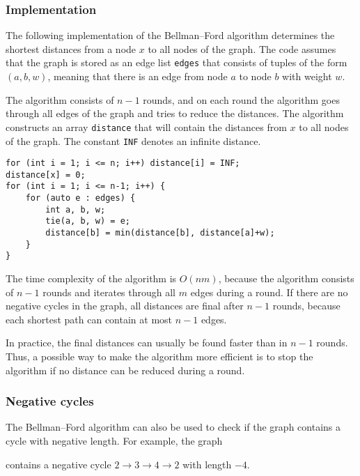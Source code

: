 \subsubsection{Implementation}

The following implementation of the
Bellman–Ford algorithm determines the shortest distances
from a node $x$ to all nodes of the graph.
The code assumes that the graph is stored
as an edge list \texttt{edges}
that consists of tuples of the form $(a,b,w)$,
meaning that there is an edge from node $a$ to node $b$
with weight $w$.

The algorithm consists of $n-1$ rounds,
and on each round the algorithm goes through
all edges of the graph and tries to
reduce the distances.
The algorithm constructs an array \texttt{distance}
that will contain the distances from $x$
to all nodes of the graph.
The constant \texttt{INF} denotes an infinite distance.

\begin{lstlisting}
for (int i = 1; i <= n; i++) distance[i] = INF;
distance[x] = 0;
for (int i = 1; i <= n-1; i++) {
    for (auto e : edges) {
        int a, b, w;
        tie(a, b, w) = e;
        distance[b] = min(distance[b], distance[a]+w);
    }
}
\end{lstlisting}

The time complexity of the algorithm is $O(nm)$,
because the algorithm consists of $n-1$ rounds and
iterates through all $m$ edges during a round.
If there are no negative cycles in the graph,
all distances are final after $n-1$ rounds,
because each shortest path can contain at most $n-1$ edges.

In practice, the final distances can usually
be found faster than in $n-1$ rounds.
Thus, a possible way to make the algorithm more efficient
is to stop the algorithm if no distance
can be reduced during a round.

\subsubsection{Negative cycles}


The Bellman–Ford algorithm can also be used to
check if the graph contains a cycle with negative length.
For example, the graph

\begin{center}
\end{center}
\noindent
contains a negative cycle
$2 \rightarrow 3 \rightarrow 4 \rightarrow 2$
with length $-4$.

